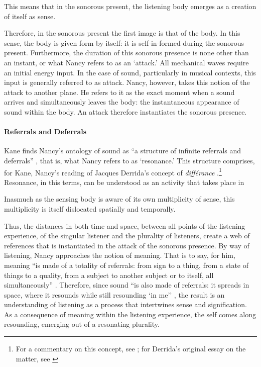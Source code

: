 This means that in the sonorous present, the listening body emerges as a creation of itself as sense. 

Therefore, in the sonorous present the first image is that of the body. In this sense, the body is given form by itself: it is self-in-formed during the sonorous present. Furthermore, the duration of this sonorous presence is none other than an instant, or what Nancy refers to as an `attack.' All mechanical waves require an initial energy input. In the case of sound, particularly in musical contexts, this input is generally referred to as attack. Nancy, however, takes this notion of the attack to another plane. He refers to it as the exact moment when a sound arrives and simultaneously leaves the body: the instantaneous appearance of sound within the body. An attack therefore instantiates the sonorous presence.

\paragraph{Referrals and Deferrals}
Kane finds Nancy's ontology of sound as ``a structure of infinite referrals and deferrals'' \parencite[143]{Gra15:The}, that is, what Nancy refers to as `resonance.' This structure comprises, for Kane, Nancy's reading of Jacques Derrida's concept of \textit{différance} .\footnote{For a commentary on this concept, see \parencite[71-72]{Gra15:The}; for Derrida's original essay on the matter, see \parencite{Der78:Wri,Der82:Mar}} Resonance, in this terms, can be understood as an activity that takes place in 

Inasmuch as the sensing body is aware of its own multiplicity of sense, this multiplicity is itself dislocated spatially and temporally. 

Thus, the distances in both time and space, between all points of the listening experience, of the singular listener and the plurality of listeners, create a web of references that is instantiated in the attack of the sonorous presence. By way of listening, Nancy approaches the notion of meaning. That is to say, for him, meaning ``is made of a totality of referrals: from sign to a thing, from a state of things to a quality, from a subject to another subject or to itself, all simultaneously'' \parencite[4-9]{Nan07:Lis}. Therefore, since sound  ``is also made of referrals: it spreads in space, where it resounds while still resounding `in me'' \parencite[4-9]{Nan07:Lis}, the result is an understanding of listening as a process that intertwines sense and signification. As a consequence of meaning within the listening experience, the self comes along resounding, emerging out of a resonating plurality.

